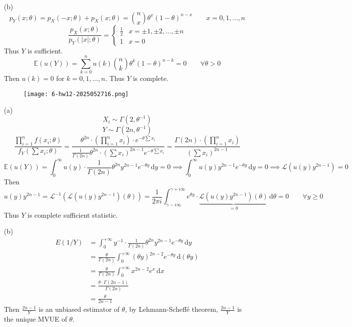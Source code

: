 (b)
\[
p_{Y}(x;\theta)=p_{X}(-x;\theta)+p_{X}(x;\theta)=\binom{n}{x} \theta^{x}(1-\theta)^{n-x}\qquad x=0,1,\dots,n
\]
\[
\frac{p_{X}(x;\theta)}{p_{Y}(\lvert x \rvert ;\theta)}=\begin{cases}
\frac{1}{2} & x=\pm1,\pm2,\dots,\pm n \\
1 & x=0
\end{cases}
\]
Thus $Y$ is sufficient.
\[
\mathbb{E}(u(Y))=\sum_{k=0}^{n} u(k)\binom{n}{k} \theta^{k}(1-\theta)^{n-k}=0\qquad \forall \theta>0
\]
Then $u(k)=0$ for $k=0,1,\dots,n$. Thus $Y$ is complete.

\begin{exercise}
\begin{figure}[H]
\centering
\texttt{[image: 6-hw12-2025052716.png]}
\label{}
\end{figure}
\end{exercise}
(a)
\[
X_i\sim \Gamma(2,\theta ^{-1})
\]
\[
Y\sim \Gamma(2n,\theta ^{-1})
\]
\[
\frac{\prod_{i=1}^{n} f(x_i;\theta)}{f_{Y}\left( \sum x_i;\theta \right)}=\frac{\theta^{2n}\cdot\left( \prod_{i=1}^{n} x_i \right)\cdot e^{ -\theta \sum x_i }}{\frac{1}{\Gamma(2n)}\theta^{2n}\cdot\left( \sum x_i \right)^{2n-1}e^{ -\theta \sum x_i }}=\frac{\Gamma(2n)\cdot\left( \prod_{i=1}^{n} x_i \right)}{\left( \sum x_i \right)^{2n-1}}
\]
\[
\mathbb{E}(u(Y))=\int_{0}^{\infty} u(y)\cdot\frac{1}{\Gamma(2n)}\theta^{2n}y^{2n-1}e^{ -\theta y } \, \mathrm{d}y=0\implies \int_{0}^{\infty} u(y)y^{2n-1}e^{ -\theta y } \, \mathrm{d}y=0\implies \mathscr{L}(u(y)y^{2n-1})=0
\]
Then
\[
u(y)y^{2n-1}=\mathscr{L}^{-1}(\mathscr{L}(u(y)y^{2n-1})(\theta))=\frac{1}{2\pi i}\int_{\gamma-i\infty}^{\gamma+i\infty} e^{ \theta y }\cdot \underbrace{ \mathscr{L}(u(y)y^{2n-1})(\theta) }_{ =0 } \, \mathrm{d}\theta =0\qquad \forall y\geq 0
\]
Thus $Y$ is complete sufficient statistic.

(b)
\[
\begin{aligned}
E(1/Y) & =\int_{0}^{+\infty} y^{-1}\cdot\frac{1}{\Gamma(2n)}\theta^{2n}y^{2n-1}e^{ -\theta y } \, \mathrm{d}y  \\
 & =\frac{\theta}{\Gamma(2n)} \int_{0}^{+\infty} (\theta y)^{2n-2}e^{ -\theta y } \, \mathrm{d}(\theta y) \\
 & =\frac{\theta}{\Gamma(2n)}\int_{0}^{+\infty} x^{2n-2}e^{ x } \, \mathrm{d}x  \\
 & =\frac{\theta \cdot\Gamma(2n-1)}{\Gamma(2n)} \\
 & =\frac{\theta}{2n-1}
\end{aligned} 
\]
Then $\frac{2n-1}{Y}$ is an unbiased estimator of $\theta$, by Lehmann-Scheffé theorem, $\frac{2n-1}{Y}$ is the unique MVUE of $\theta$.

